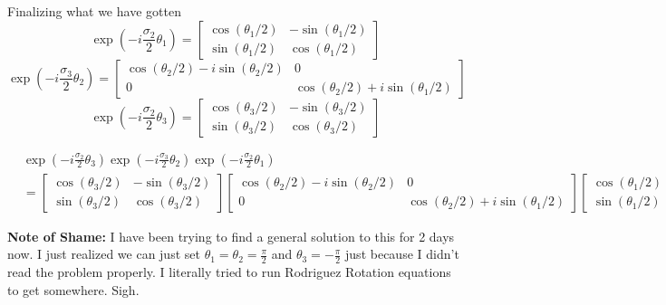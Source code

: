 \documentclass[letter, 10pts]{article}
\begin{document}
Finalizing what we have gotten 
\[
\exp 
\left(- i \frac{\sigma_2}{2 } \theta_1 \right) = 
\begin{bmatrix} \cos ( \theta_1 / 2) & 
- \sin (\theta_1 / 2) \\ 
\sin(\theta_1 / 2) & 
\cos ( \theta_1 / 2)\end{bmatrix} 
\]
\[
\exp
\left(
- i \frac{\sigma_3}{2} \theta_2
\right)
=
\begin{bmatrix} \cos ( \theta_2 / 2 ) - i \sin (\theta_2 / 2) & 
0 
\\
0 & 
\cos ( \theta_2 / 2) + i \sin (\theta_1 / 2)\end{bmatrix} 
\] 
\[
\exp 
\left(- i \frac{\sigma_2}{2 } \theta_3 \right) = 
\begin{bmatrix} \cos ( \theta_3 / 2) & 
- \sin (\theta_3 / 2) \\ 
\sin(\theta_3 / 2) & 
\cos ( \theta_3 / 2)\end{bmatrix} 
\]

\begin{align*}
& \exp 
\left(- i \frac{\sigma_2}{2 } \theta_3 \right) 
\exp 
\left(- i \frac{\sigma_3}{2 } \theta_2 \right) 
\exp
\left(
- i \frac{\sigma_2}{2} \theta_1
\right)  \\
&=
		\begin{bmatrix} \cos ( \theta_3 / 2) & 
- \sin (\theta_3 / 2) \\ 
\sin(\theta_3 / 2) & 
\cos ( \theta_3 / 2)\end{bmatrix} 
	\begin{bmatrix} \cos ( \theta_2 / 2 ) - i \sin (\theta_2 / 2) & 
0 
\\
0 & 
\cos ( \theta_2 / 2) + i \sin (\theta_1 / 2)\end{bmatrix} 
	\begin{bmatrix} \cos ( \theta_1 / 2) & 
- \sin (\theta_1 / 2) \\ 
\sin(\theta_1 / 2) & 
\cos ( \theta_1 / 2)\end{bmatrix} 
\end{align*} 

\textbf{Note of Shame: }I have been trying to find a general solution to this for 2 days now. I just realized we can just set $\theta_1 = \theta_2 = \frac{\pi }{2}$ and $\theta_3 = - \frac{\pi}{ 2}$ just because I didn't read the problem properly. I literally tried to run Rodriguez Rotation equations to get somewhere. Sigh.
\end{document}
